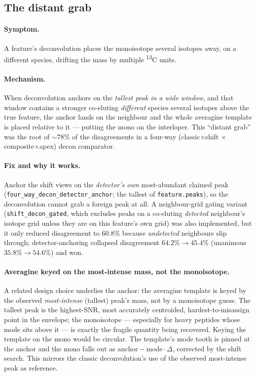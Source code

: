 \documentclass[11pt]{article}
\newcommand{\Cthirteen}{\textsuperscript{13}C}
\begin{document}
\subsection{The distant grab}
\label{sec:distant-grab}

\paragraph{Symptom.} A feature's deconvolution places the monoisotope several isotopes away, on a
different species, drifting the mass by multiple \Cthirteen{} units.

\paragraph{Mechanism.} When deconvolution anchors on the \emph{tallest peak in a wide window}, and
that window contains a stronger co-eluting \emph{different} species several isotopes above the true
feature, the anchor lands on the neighbour and the whole averagine template is placed relative to
it --- putting the mono on the interloper. This ``distant grab'' was the root of $\sim78\%$ of the
disagreements in a four-way (classic$\times$shift $\times$ composite$\times$apex) decon comparator.

\paragraph{Fix and why it works.} Anchor the shift views on the \emph{detector's own} most-abundant
claimed peak (\texttt{four\_way\_decon\_detector\_anchor}; the tallest of \texttt{feature.peaks}),
so the deconvolution cannot grab a foreign peak at all. A neighbour-grid gating variant
(\texttt{shift\_decon\_gated}, which excludes peaks on a co-eluting \emph{detected} neighbour's
isotope grid unless they are on this feature's own grid) was also implemented, but it only reduced
disagreement to $60.8\%$ because \emph{undetected} neighbours slip through; detector-anchoring
collapsed disagreement $64.2\% \rightarrow 45.4\%$ (unanimous $35.8\% \rightarrow 54.6\%$) and won.

\paragraph{Averagine keyed on the most-intense mass, not the monoisotope.} A related design choice
underlies the anchor: the averagine template is keyed by the observed \emph{most-intense} (tallest)
peak's mass, not by a monoisotope guess. The tallest peak is the highest-SNR, most accurately
centroided, hardest-to-misassign point in the envelope; the monoisotope --- especially for heavy
peptides whose mode sits above it --- is exactly the fragile quantity being recovered. Keying the
template on the mono would be circular. The template's mode tooth is pinned at the anchor and the
mono falls out as $\text{anchor} - \text{mode}\cdot\Delta$, corrected by the shift search. This
mirrors the classic deconvolution's use of the observed most-intense peak as reference.
\end{document}
